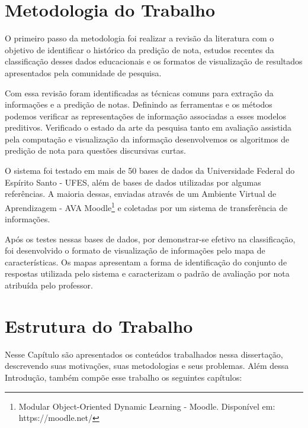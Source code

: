 \section{Metodologia do Trabalho}

O primeiro passo da metodologia foi realizar a revisão da literatura com o objetivo de identificar o histórico da predição de nota, estudos recentes da classificação desses dados educacionais e os formatos de visualização de resultados apresentados pela comunidade de pesquisa.

Com essa revisão foram identificadas as técnicas comuns para extração da informações e a predição de notas. Definindo as ferramentas e os métodos podemos verificar as representações de informação associadas a esses modelos preditivos. Verificado o estado da arte da pesquisa tanto em avaliação assistida pela computação e visualização da informação desenvolvemos os algoritmos de predição de nota para questões discursivas curtas.

O sistema foi testado em mais de 50 bases de dados da Universidade Federal do Espírito Santo - UFES, além de bases de dados utilizadas por algumas referências. A maioria dessas, enviadas através de um Ambiente Virtual de Aprendizagem - AVA Moodle\footnote{Modular Object-Oriented Dynamic Learning - Moodle. Disponível em: https://moodle.net/} e coletadas por um sistema de transferência de informações.

Após os testes nessas bases de dados, por demonstrar-se efetivo na classificação, foi desenvolvido o formato de visualização de informações pelo mapa de características. Os mapas apresentam a forma de identificação do conjunto de respostas utilizada pelo sistema e caracterizam o padrão de avaliação por nota atribuída pelo professor.


\section{Estrutura do Trabalho}

Nesse Capítulo são apresentados os conteúdos trabalhados nessa dissertação, descrevendo suas motivações, suas metodologias e seus problemas. Além dessa Introdução, também compõe esse trabalho os seguintes capítulos:

